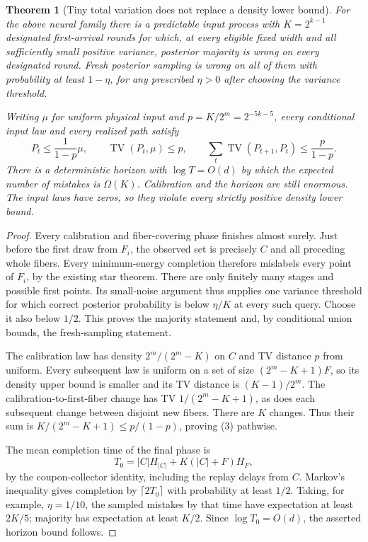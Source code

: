 \documentclass[11pt]{article}
\newtheorem{theorem}{Theorem}
\newcommand{\TV}{\operatorname{TV}}
\begin{document}
\begin{theorem}[Tiny total variation does not replace a density lower bound]
For the above neural family there is a predictable input process with
$K=2^{k-1}$ designated first-arrival rounds for which, at every eligible
fixed width and all sufficiently small positive variance, posterior
majority is wrong on every designated round. Fresh posterior sampling
is wrong on all of them with probability at least $1-\eta$, for any
prescribed $\eta>0$ after choosing the variance threshold.

Writing $\mu$ for uniform physical input and $p=K/2^m=2^{-5k-5}$,
every conditional input law and every realized path satisfy
\[
 P_t\le\frac1{1-p}\mu,\qquad
 \TV(P_t,\mu)\le p,\qquad
 \sum_t\TV(P_{t+1},P_t)\le\frac p{1-p}.                  \tag{3}
\]
There is a deterministic horizon with $\log T=O(d)$ by which the
expected number of mistakes is $\Omega(K)$. Calibration and the horizon
are still enormous. The input laws have zeros, so they violate every
strictly positive density lower bound.
\end{theorem}
\begin{proof}
Every calibration and fiber-covering phase finishes almost surely.
Just before the first draw from $F_i$, the observed set is precisely
$C$ and all preceding whole fibers. Every minimum-energy completion
therefore mislabels every point of $F_i$, by the existing star theorem.
There are only finitely many stages and possible first points. Its
small-noise argument thus supplies one variance threshold for which
correct posterior probability is below $\eta/K$ at every such query.
Choose it also below $1/2$. This proves the majority statement and,
by conditional union bounds, the fresh-sampling statement.

The calibration law has density $2^m/(2^m-K)$ on $C$ and TV distance
$p$ from uniform. Every subsequent law is uniform on a set of size
$(2^m-K+1)F$, so its density upper bound is smaller and its TV distance
is $(K-1)/2^m$. The calibration-to-first-fiber change has TV
$1/(2^m-K+1)$, as does each subsequent change between disjoint new
fibers. There are $K$ changes. Thus their sum is
$K/(2^m-K+1)\le p/(1-p)$, proving (3) pathwise.

The mean completion time of the final phase is
\[
 T_0=|C|H_{|C|}+K(|C|+F)H_F,
\]
by the coupon-collector identity, including the replay delays from $C$.
Markov's inequality gives completion by $\lceil2T_0\rceil$ with
probability at least $1/2$. Taking, for example, $\eta=1/10$, the sampled
mistakes by that time have expectation at least $2K/5$; majority has
expectation at least $K/2$. Since $\log T_0=O(d)$, the asserted horizon
bound follows.
\end{proof}
\end{document}
